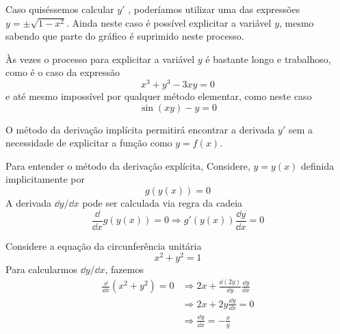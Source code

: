 \cleardoublepage\documentclass[../main.tex]{subfiles}
\begin{document}
Caso quiséssemos calcular $y'$ , poderíamos utilizar uma das expressões $y =\pm\sqrt{1-x^2}$. Ainda neste 
caso é possível explicitar a variável $y$, mesmo sabendo que parte do gráfico é suprimido neste 
processo. 

 Às vezes o processo para explicitar a variável $y$ é bastante longo e trabalhoso, como é o caso da 
expressão 
$$x^3+ y^3- 3xy=0$$
e até mesmo impossível por qualquer método elementar, como neste caso 
$$\sin(xy) - y = 0$$

O método da derivação implícita permitirá encontrar a derivada $y'$ sem a necessidade de explicitar 
a função como $y = f ( x)$. 

Para entender o método da derivação explícita, Considere, $y = y(x)$ definida implicitamente por
\begin{equation*}
  g(y(x)) = 0
\end{equation*}
A derivada $\dd y/\dd x$ pode ser calculada via regra da cadeia
\begin{equation*}
  \frac{\dd}{\dd x}g(y(x)) =0 \Rightarrow g'(y(x))\frac{\dd y}{\dd x} = 0
\end{equation*}

\begin{ex}
  Considere a equação da circunferência unitária
  \begin{equation*}
    x^2 + y^2 = 1
  \end{equation*}
  Para calcularmos $\dd y/\dd x$, fazemos
  \begin{align*}
    \frac{\dd}{\dd x}\left(x^2+y^2\right) = 0 &\Rightarrow 2x + \frac{\dd (2y)}{\dd y}\frac{\dd y}{\dd x}\\
                                                                &\Rightarrow 2x + 2y\frac{\dd y}{\dd x} = 0\\
                                                                &\Rightarrow \frac{\dd y}{\dd x} = -\frac{x}{y}
  \end{align*}
\end{ex}
\end{document}
